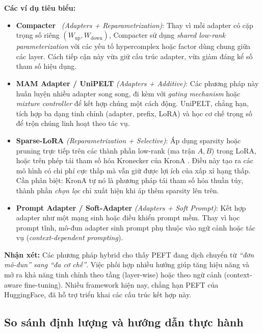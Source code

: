 \textbf{Các ví dụ tiêu biểu:}
\begin{itemize}
	\item \textbf{Compacter}~\cite{mahabadi2021compacter} \textit{(Adapters + Reparametrization)}:  
	Thay vì mỗi adapter có cặp trọng số riêng $(W_{\text{up}}, W_{\text{down}})$, Compacter sử dụng \emph{shared low-rank parameterization} với các yếu tố hypercomplex hoặc factor dùng chung giữa các layer.  
	Cách tiếp cận này vừa giữ cấu trúc adapter, vừa giảm đáng kể số tham số hiệu dụng.
	
	\item \textbf{MAM Adapter / UniPELT\cite{ma2022unipelt}} \textit{(Adapters + Additive)}:  
	Các phương pháp này huấn luyện nhiều adapter song song, đi kèm với \emph{gating mechanism} hoặc \emph{mixture controller} để kết hợp chúng một cách động.  
	UniPELT, chẳng hạn, tích hợp ba dạng tinh chỉnh (adapter, prefix, LoRA) và học cơ chế trọng số để trộn chúng linh hoạt theo tác vụ.
	
	\item \textbf{Sparse-LoRA} \textit{(Reparametrization + Selective)}:
	Áp dụng sparsity hoặc pruning trực tiếp trên các thành phần low-rank (ma trận $A,B$) trong LoRA, hoặc trên phép tái tham số hóa Kronecker của KronA \cite{buczak2023krona}.
	Điều này tạo ra các mô hình có chi phí cực thấp mà vẫn giữ được lợi ích của xấp xỉ hạng thấp. Cần phân biệt: KronA tự nó là phương pháp tái tham số hóa thuần túy, thành phần \emph{chọn lọc} chỉ xuất hiện khi áp thêm sparsity lên trên.
	
	\item \textbf{Prompt Adapter / Soft-Adapter} \textit{(Adapters + Soft Prompt)}:
	Kết hợp adapter như một mạng sinh hoặc điều khiển prompt mềm.
	Thay vì học prompt tĩnh, mô-đun adapter sinh prompt phụ thuộc vào ngữ cảnh hoặc tác vụ (\textit{context-dependent prompting}).
\end{itemize}

\textbf{Nhận xét:}
Các phương pháp hybrid cho thấy PEFT đang dịch chuyển từ \emph{“đơn mô-đun” sang “đa cơ chế”}.
Việc phối hợp nhiều hướng giúp tăng hiệu năng và mở ra khả năng tinh chỉnh theo tầng (layer-wise) hoặc theo ngữ cảnh (context-aware fine-tuning).
Nhiều framework hiện nay, chẳng hạn PEFT của HuggingFace, đã hỗ trợ triển khai các cấu trúc kết hợp này.

\subsection{So sánh định lượng và hướng dẫn thực hành}
\label{ssec:comparison}

